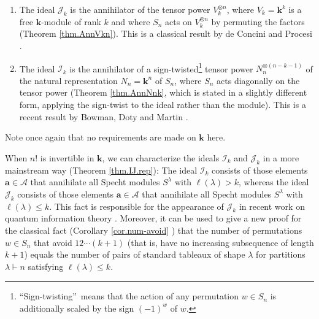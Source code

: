 \documentclass[numbers=enddot,12pt,final,onecolumn,notitlepage]{scrartcl}%
\numberwithin{exer}{subsection}
\theoremstyle{definition}
\begin{document}
\begin{enumerate}
\item The ideal $\mathcal{J}_{k}$ is the annihilator of the tensor power
$V_{k}^{\otimes n}$, where $V_{k}=\mathbf{k}^{k}$ is a free $\mathbf{k}%
$-module of rank $k$ and where $S_{n}$ acts on $V_{k}^{\otimes n}$ by
permuting the factors (Theorem \ref{thm.AnnVkn}). This is a classical result
by de Concini and Procesi \cite[Theorem 4.2]{deCPro76}.

\item The ideal $\mathcal{I}_{k}$ is the annihilator of a
sign-twisted\footnote{\textquotedblleft Sign-twisting\textquotedblright\ means
that the action of any permutation $w\in S_{n}$ is additionally scaled by the
sign $\left(  -1\right)  ^{w}$ of $w$.} tensor power $N_{n}^{\otimes\left(
n-k-1\right)  }$ of the natural representation $N_{n}=\mathbf{k}^{n}$ of
$S_{n}$, where $S_{n}$ acts diagonally on the tensor power (Theorem
\ref{thm.AnnNnk}, which is stated in a slightly different form, applying the
sign-twist to the ideal rather than the module). This is a recent result by
Bowman, Doty and Martin \cite[Theorem 7.4 (a)]{BoDoMa18}.
\end{enumerate}

Note once again that no requirements are made on $\mathbf{k}$ here.

When $n!$ is invertible in $\mathbf{k}$, we can characterize the ideals
$\mathcal{I}_{k}$ and $\mathcal{J}_{k}$ in a more mainstream way (Theorem
\ref{thm.IJ.rep}): The ideal $\mathcal{I}_{k}$ consists of those elements
$\mathbf{a}\in\mathcal{A}$ that annihilate all Specht modules $S^{\lambda}$
with $\ell\left(  \lambda\right)  >k$, whereas the ideal $\mathcal{J}_{k}$
consists of those elements $\mathbf{a}\in\mathcal{A}$ that annihilate all
Specht modules $S^{\lambda}$ with $\ell\left(  \lambda\right)  \leq k$. This
fact is responsible for the appearance of $\mathcal{J}_{k}$ in recent work on
quantum information theory \cite[Theorem 2.2]{KlStVo25}. Moreover, it can be
used to give a new proof for the classical fact (Corollary \ref{cor.num-avoid}%
) that the number of permutations $w\in S_{n}$ that avoid $12\cdots\left(
k+1\right)  $ (that is, have no increasing subsequence of length $k+1$) equals
the number of pairs of standard tableaux of shape $\lambda$ for partitions
$\lambda\vdash n$ satisfying $\ell\left(  \lambda\right)  \leq k$.
\end{document}
